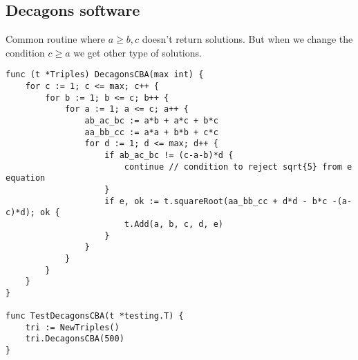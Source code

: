 \documentclass[11pt]{article}
\begin{document}
\subsection{Decagons software}

Common routine where $a \ge b,c$ doesn't return solutions. But when we change the condition $c \ge a$ we get 
other type of solutions.

\begin{lstlisting}
func (t *Triples) DecagonsCBA(max int) {
	for c := 1; c <= max; c++ {
		for b := 1; b <= c; b++ {
			for a := 1; a <= c; a++ {
				ab_ac_bc := a*b + a*c + b*c
				aa_bb_cc := a*a + b*b + c*c
				for d := 1; d <= max; d++ {
					if ab_ac_bc != (c-a-b)*d {
						continue // condition to reject sqrt{5} from e equation
					}
					if e, ok := t.squareRoot(aa_bb_cc + d*d - b*c -(a-c)*d); ok {
						t.Add(a, b, c, d, e)
					}
				}
			}
		}
	}
}

func TestDecagonsCBA(t *testing.T) {
    tri := NewTriples()
    tri.DecagonsCBA(500)
}
\end{lstlisting}
\end{document}
